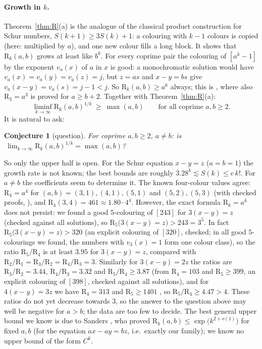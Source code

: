\documentclass[11pt,a4paper]{article}
\newtheorem{conjecture}[theorem]{Conjecture}
\theoremstyle{definition}
\theoremstyle{remark}
\newcommand{\R}{\mathrm{R}}
\begin{document}
\paragraph{Growth in $k$.} Theorem~\ref{thm:R}(a) is the analogue of the classical product construction for Schur numbers, $S(k+1)\ge3S(k)+1$: a colouring with $k-1$ colours is copied (here: multiplied by $a$), and one new colour fills a long block. It shows that $\R_k(a,b)$ grows at least like $b^k$. For every coprime pair the colouring of $[a^k-1]$ by the exponent $v_a(x)$ of $a$ in $x$ is good: a monochromatic solution would have $v_a(x)=v_a(y)=v_a(z)=j$, but $z=as$ and $x-y=bs$ give $v_a(x-y)=v_a(s)=j-1<j$. So $\R_k(a,b)\ge a^k$ always; this is \cite[Lemma~4.1]{CDW22}, where also $\R_3=a^3$ is proved for $a\ge b+2$. Together with Theorem~\ref{thm:R}(a):
\[
  \liminf_{k\to\infty}\R_k(a,b)^{1/k}\ \ge\ \max(a,b)\qquad\text{for all coprime }a,b\ge2 .
\]
It is natural to ask:
\begin{conjecture}[question]\label{conj:growth}
For coprime $a,b\ge2$, $a\ne b$: is $\ \lim_{k\to\infty}\R_k(a,b)^{1/k}=\max(a,b)$?
\end{conjecture}
So only the upper half is open. For the Schur equation $x-y=z$ ($a=b=1$) the growth rate is not known; the best bounds are roughly $3.28^k\lesssim S(k)\le e\,k!$. For $a\ne b$ the coefficients seem to determine it. The known four-colour values agree: $\R_4=a^4$ for $(a,b)=(3,1),(4,1),(5,1)$ \cite[Table~10]{CDW22} and $(5,2),(5,3)$ (with checked proofs, \cite{Ich26b}), and $\R_4(3,4)=461\approx1.80\cdot4^4$. However, the exact formula $\R_k=a^k$ does not persist: we found a good $5$-colouring of $[243]$ for $3(x-y)=z$ (checked against all solutions), so $\R_5\bigl(3(x-y)=z\bigr)>243=3^5$. In fact $\R_5\bigl(3(x-y)=z\bigr)>320$ (an explicit colouring of $[320]$, checked; in all good $5$-colourings we found, the numbers with $v_3(x)=1$ form one colour class), so the ratio $\R_5/\R_4$ is at least $3.95$ for $3(x-y)=z$, compared with $\R_2/\R_1=\R_3/\R_2=\R_4/\R_3=3$. Similarly for $3(x-y)=2z$ the ratios are $\R_3/\R_2=3.44$, $\R_4/\R_3=3.32$ and $\R_5/\R_4\ge3.87$ (from $\R_4=103$ and $\R_5\ge399$, an explicit colouring of $[398]$, checked against all solutions), and for $4(x-y)=3z$ we have $\R_4=313$ and $\R_5\ge1401$ \cite{Ich26b}, so $\R_5/\R_4\ge4.47>4$. These ratios do not yet decrease towards $3$, so the answer to the question above may well be negative for $a>b$; the data are too few to decide. The best general upper bound we know is due to Sanders \cite{San26}, who proved $\R_k(a,b)\le\exp\bigl(k^{2+o(1)}\bigr)$ for fixed $a,b$ (for the equation $ax-ay=bz$, i.e.\ exactly our family); we know no upper bound of the form $C^k$.
\end{document}

